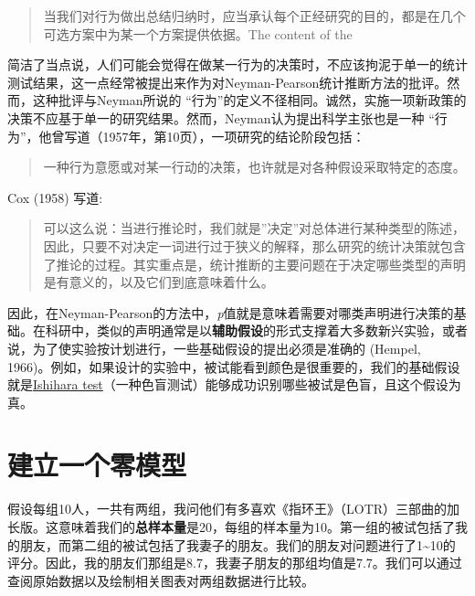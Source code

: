 \documentclass[
  letterpaper,
  DIV=11,
  numbers=noendperiod]{scrreprt}
\begin{document}
\begin{quote}
当我们对行为做出总结归纳时，应当承认每个正经研究的目的，都是在几个可选方案中为某一个方案提供依据。The
content of the
\end{quote}

简洁了当点说，人们可能会觉得在做某一行为的决策时，不应该拘泥于单一的统计测试结果，这一点经常被提出来作为对Neyman-Pearson统计推断方法的批评。然而，这种批评与Neyman所说的
``行为''的定义不径相同。诚然，实施一项新政策的决策不应基于单一的研究结果。然而，Neyman认为提出科学主张也是一种
``行为''，他曾写道（1957年，第10页），一项研究的结论阶段包括：

\begin{quote}
一种行为意愿或对某一行动的决策，也许就是对各种假设采取特定的态度。
\end{quote}

Cox (1958) 写道:

\begin{quote}
可以这么说：当进行推论时，我们就是''决定''对总体进行某种类型的陈述，因此，只要不对决定一词进行过于狭义的解释，那么研究的统计决策就包含了推论的过程。其实重点是，统计推断的主要问题在于决定哪些类型的声明是有意义的，以及它们到底意味着什么。
\end{quote}

因此，在Neyman-Pearson的方法中，\emph{p}值就是意味着需要对哪类声明进行决策的基础。在科研中，类似的声明通常是以\textbf{辅助假设}的形式支撑着大多数新兴实验，或者说，为了使实验按计划进行，一些基础假设的提出必须是准确的
(Hempel,
1966)。例如，如果设计的实验中，被试能看到颜色是很重要的，我们的基础假设就是\href{https://en.wikipedia.org/wiki/Ishihara_test}{Ishihara
test}（一种色盲测试）能够成功识别哪些被试是色盲，且这个假设为真。

\hypertarget{ux5efaux7acbux4e00ux4e2aux96f6ux6a21ux578b}{%
\section{建立一个零模型}\label{ux5efaux7acbux4e00ux4e2aux96f6ux6a21ux578b}}

假设每组10人，一共有两组，我问他们有多喜欢《指环王》（LOTR）三部曲的加长版。这意味着我们的\textbf{总样本量}是20，每组的样本量为10。第一组的被试包括了我的朋友，而第二组的被试包括了我妻子的朋友。我们的朋友对问题进行了1\textasciitilde10的评分。因此，我的朋友们那组是8.7，我妻子朋友的那组均值是7.7。我们可以通过查阅原始数据以及绘制相关图表对两组数据进行比较。
\end{document}
